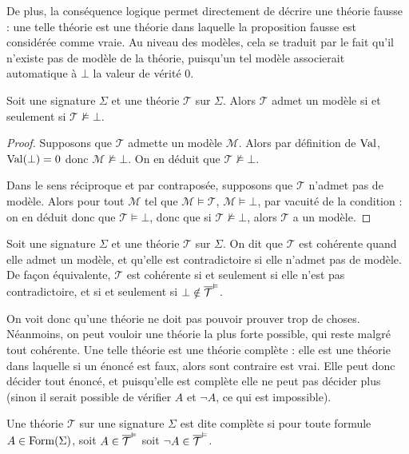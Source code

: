 De plus, la conséquence logique permet directement de décrire une théorie
\og fausse\fg{} : une telle théorie est une théorie dans laquelle la proposition
fausse est considérée comme vraie. Au niveau des modèles, cela se traduit par le
fait qu'il n'existe pas de modèle de la théorie, puisqu'un tel modèle associerait
automatique à $\bot$ la valeur de vérité $0$.

\begin{proposition}
  Soit une signature $\Sigma$ et une théorie $\mathcal T$ sur $\Sigma$. Alors
  $\mathcal T$ admet un modèle si et seulement si $\mathcal T \not\vDash \bot$.
\end{proposition}

\begin{proof}
  Supposons que $\mathcal T$ admette un modèle $\mathcal M$. Alors par définition
  de $\operatorname{Val}$, $\operatorname{Val}(\bot) = 0$ donc $\mathcal M\not\models \bot$. On en déduit
  que $\mathcal T\not\vDash\bot$.

  Dans le sens réciproque et par contraposée, supposons que $\mathcal T$ n'admet
  pas de modèle. Alors pour tout $\mathcal M$ tel que
  $\mathcal M\models \mathcal T$, $\mathcal M\models \bot$, par vacuité de la
  condition : on en déduit donc que $\mathcal T \vDash \bot$, donc que si
  $\mathcal T \not\vDash\bot$, alors $\mathcal T$ a un modèle.
\end{proof}

\begin{definition}
  Soit une signature $\Sigma$ et une théorie $\mathcal T$ sur $\Sigma$. On dit
  que $\mathcal T$ est cohérente quand elle admet un modèle, et qu'elle est
  contradictoire si elle n'admet pas de modèle. De façon équivalente,
  $\mathcal T$ est cohérente si et seulement si elle n'est pas contradictoire,
  et si et seulement si $\bot\notin\overline{\mathcal T}^{\vDash}$.
\end{definition}

On voit donc qu'une théorie ne doit pas pouvoir prouver trop de choses.
Néanmoins, on peut vouloir une théorie la plus forte possible, qui reste malgré
tout cohérente. Une telle théorie est une théorie complète : elle est une théorie
dans laquelle si un énoncé est faux, alors sont contraire est vrai. Elle peut
donc décider tout énoncé, et puisqu'elle est complète elle ne peut pas décider
plus (sinon il serait possible de vérifier $A$ et $\lnot A$, ce qui est
impossible).

\begin{definition}
  Une théorie $\mathcal T$ sur une signature $\Sigma$ est dite complète si pour
  toute formule $A\in\operatorname{Form}(\Sigma)$, soit $A\in \overline{\mathcal T}^{\vDash}$ soit
  $\lnot A \in \overline{\mathcal T}^{\vDash}$.
\end{definition}

